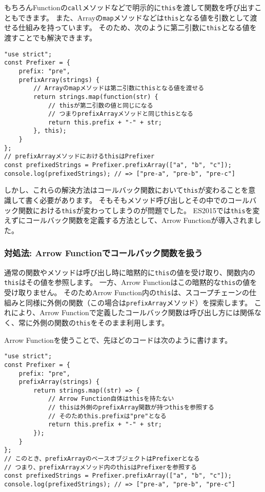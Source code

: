 もちろんFunctionの\texttt{call}メソッドなどで明示的に\texttt{this}を渡して関数を呼び出すこともできます。
また、Arrayの\texttt{map}メソッドなどは\texttt{this}となる値を引数として渡せる仕組みを持っています。
そのため、次のように第二引数に\texttt{this}となる値を渡すことでも解決できます。

\begin{lstlisting}
"use strict";
const Prefixer = {
    prefix: "pre",
    prefixArray(strings) {
        // Arrayのmapメソッドは第二引数にthisとなる値を渡せる
        return strings.map(function(str) {
            // thisが第二引数の値と同じになる
            // つまりprefixArrayメソッドと同じthisとなる
            return this.prefix + "-" + str;
        }, this);
    }
};
// prefixArrayメソッドにおけるthisはPrefixer
const prefixedStrings = Prefixer.prefixArray(["a", "b", "c"]);
console.log(prefixedStrings); // => ["pre-a", "pre-b", "pre-c"]
\end{lstlisting}

しかし、これらの解決方法はコールバック関数において\texttt{this}が変わることを意識して書く必要があります。
そもそもメソッド呼び出しとその中でのコールバック関数における\texttt{this}が変わってしまうのが問題でした。
ES2015では\texttt{this}を変えずにコールバック関数を定義する方法として、Arrow
Functionが導入されました。

\hypertarget{arrow-function-callback}{%
\subsubsection{対処法: Arrow
Functionでコールバック関数を扱う}\label{arrow-function-callback}}

通常の関数やメソッドは呼び出し時に暗黙的に\texttt{this}の値を受け取り、関数内の\texttt{this}はその値を参照します。
一方、Arrow
Functionはこの暗黙的な\texttt{this}の値を受け取りません。
そのためArrow
Function内の\texttt{this}は、スコープチェーンの仕組みと同様に外側の関数（この場合は\texttt{prefixArray}メソッド）を探索します。
これにより、Arrow
Functionで定義したコールバック関数は呼び出し方には関係なく、常に外側の関数の\texttt{this}をそのまま利用します。

Arrow Functionを使うことで、先ほどのコードは次のように書けます。

\begin{lstlisting}
"use strict";
const Prefixer = {
    prefix: "pre",
    prefixArray(strings) {
        return strings.map((str) => {
            // Arrow Function自体はthisを持たない
            // thisは外側のprefixArray関数が持つthisを参照する
            // そのためthis.prefixは"pre"となる
            return this.prefix + "-" + str;
        });
    }
};
// このとき、prefixArrayのベースオブジェクトはPrefixerとなる
// つまり、prefixArrayメソッド内のthisはPrefixerを参照する
const prefixedStrings = Prefixer.prefixArray(["a", "b", "c"]);
console.log(prefixedStrings); // => ["pre-a", "pre-b", "pre-c"]
\end{lstlisting}

